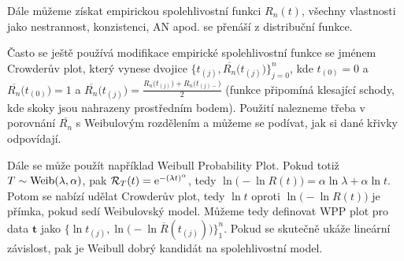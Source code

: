 Dále můžeme získat empirickou spolehlivostní funkci $R_n(t)$, všechny vlastnosti jako nestrannost, konzistenci, AN apod. se přenáší z distribuční funkce.

Často se ještě používá modifikace empirické spolehlivostní funkce se jménem Crowderův plot, který vynese dvojice $\big\{t_{(j)}, \overline{R_n}\big(t_{(j)}\big)\}_{j=0}^n$, kde $t_{(0)}=0$ a $\overline{R_n}\big(t_{(0)}\big)=1$ a $\overline{R_n}\big(t_{(j)}\big)=\frac{R_n\big(t_{(j)}\big)+R_n\big(t_{(j)-}\big)}{2}$ (funkce připomíná klesající schody, kde skoky jsou nahrazeny prostředním bodem). Použití nalezneme třeba v porovnání $\overline{R_n}$ s Weibulovým rozdělením a můžeme se podívat, jak si dané křivky odpovídají.

Dále se může použít například Weibull Probability Plot. Pokud totiž $T\sim\mathrm{Weib}(\lambda,\alpha)$, pak $\mathcal{R}_T(t)=\mathrm{e}^{-(\lambda t)^\alpha}$, tedy $\ln\big(-\ln R(t)\big)=\alpha\ln\lambda+\alpha\ln t$. Potom se nabízí udělat Crowderův plot, tedy $\ln t$ oproti $\ln\big(-\ln R(t)\big)$ je přímka, pokud sedí Weibulovský model. Můžeme tedy definovat WPP plot pro data $\textbf{t}$ jako $\big\{\ln t_{(j)},\ln\big(-\ln \overline{R}(t_{(j)})\big)\}_1^n$. Pokud se skutečně ukáže lineární závislost, pak je Weibull dobrý kandidát na spolehlivostní model.

